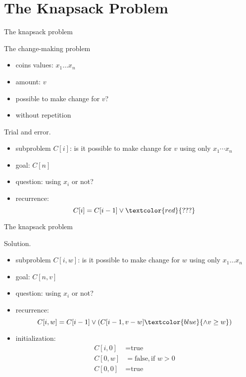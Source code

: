 \section{The Knapsack Problem}

\begin{frame}{The knapsack problem}
  \begin{exampleblock}{The change-making problem }
    \begin{itemize}
      \item coins values: $x_{1} \dots x_{n}$
      \item amount: $v$
      \item possible to make change for $v$?
      \item without repetition
    \end{itemize}
  \end{exampleblock}

  \pause
  \begin{alertblock}{Trial and error.}
    \begin{itemize}
      \item subproblem $C[i]$: is it possible to make change for $v$ using only $x_{1} \cdots x_{n}$
      \item goal: $C[n]$
      \item question: using $x_{i}$ or not?
      \item recurrence:
	\[
	  C[i] = C[i-1] \lor \textcolor{red}{???}
	\]
    \end{itemize}
  \end{alertblock}
\end{frame}
\begin{frame}{The knapsack problem}
  \begin{block}{Solution.}
    \begin{itemize}
      \item subproblem $C[i, w]$: is it possible to make change for $w$ using only $x_{1} \dots x_{n}$
      \item goal: $C[n,v]$
      \item question: using $x_{i}$ or not?
      \item recurrence:
	\[
	  C[i,w] = C[i-1] \lor (C[i-1, v-w] \textcolor{blue}{\land v \ge w})
	\]
      \item<2-> initialization:
	\begin{align*}
	  C[i,0] &= \text{true}  \\
	  C[0,w] &= \text{false}, \text{if } w > 0 \\
	  C[0,0] &= \text{true}
	\end{align*}
    \end{itemize}
  \end{block}
\end{frame}
